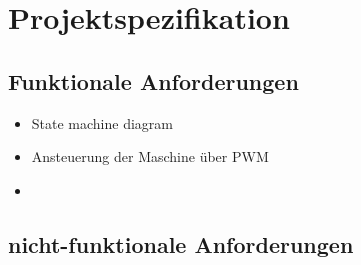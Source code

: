 \clearpage
\chapter{\textbf{Projektspezifikation}}\label{Projektspezifikation}

\section {Funktionale Anforderungen}
\begin{itemize}
	\item State machine diagram
	\item Ansteuerung der Maschine über PWM
	\item 
\end{itemize}

\section {nicht-funktionale Anforderungen}